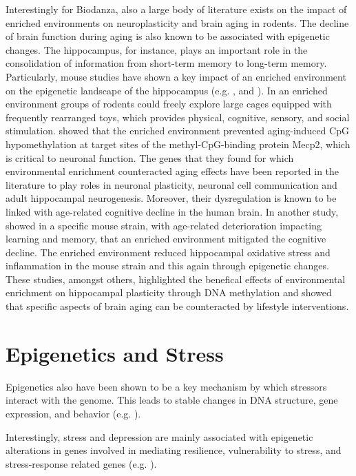 \documentclass[
  11pt,
]{book}
\begin{document}
Interestingly for Biodanza, also a large body of literature exists on the impact of enriched environments on neuroplasticity and brain aging in rodents. The decline of brain function during aging is also known to be associated with epigenetic changes. The hippocampus, for instance, plays an important role in the consolidation of information from short-term memory to long-term memory. Particularly, mouse studies have shown a key impact of an enriched environment on the epigenetic landscape of the hippocampus (e.g. \citet{zocher2021}, and \citet{grinan2016}). In an enriched environment groups of rodents could freely explore large cages equipped with frequently rearranged toys, which provides physical, cognitive, sensory, and social stimulation. \citet{zocher2021} showed that the enriched environment prevented aging-induced CpG hypomethylation at target sites of the methyl-CpG-binding protein Mecp2, which is critical to neuronal function. The genes that they found for which environmental enrichment counteracted aging effects have been reported in the literature to play roles in neuronal plasticity, neuronal cell communication and adult hippocampal neurogenesis. Moreover, their dysregulation is known to be linked with age-related cognitive decline in the human brain. In another study, \citet{grinan2016} showed in a specific mouse strain, with age-related deterioration impacting learning and memory, that an enriched environment mitigated the cognitive decline. The enriched environment reduced hippocampal oxidative stress and inflammation in the mouse strain and this again through epigenetic changes. These studies, amongst others, highlighted the benefical effects of environmental enrichment on hippocampal plasticity through DNA methylation and showed that specific aspects of brain aging can be counteracted by lifestyle interventions.

\hypertarget{epigenetics-and-stress}{%
\section{Epigenetics and Stress}\label{epigenetics-and-stress}}

Epigenetics also have been shown to be a key mechanism by which stressors interact with the genome.
This leads to stable changes in DNA structure, gene expression, and behavior (e.g. \citet{Park2019}).

Interestingly, stress and depression are mainly
associated with epigenetic alterations in genes involved in mediating resilience, vulnerability to stress, and stress-response related genes (e.g. \citet{Park2019}).
\end{document}
